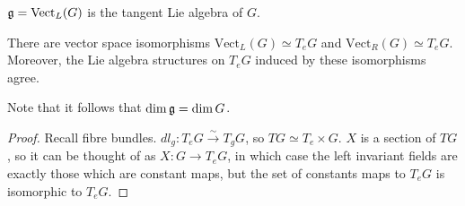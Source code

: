  \begin{definition}
   $\mathfrak{g} = \mathrm{Vect}_L(G)$ is the tangent Lie algebra of $G$. 
 \end{definition}

 \begin{proposition}
   There are vector space isomorphisms $\mathrm{Vect}_L(G)\simeq T_eG$ and
   $\mathrm{Vect}_R(G)\simeq T_eG$. Moreover, the Lie algebra structures on $T_eG$
   induced by these isomorphisms agree.
 \end{proposition}
 Note that it follows that $\dim \mathfrak{g}=\dim G$.
 \begin{proof}
   Recall fibre bundles. $dl_g:T_eG\xrightarrow{\sim} T_gG$, so $TG\simeq T_e\times
   G$. $X$ is a section of $TG$, so it can be thought of as
   $X:G\to T_eG$, in which case the left invariant fields are exactly those which are
   constant maps, but the set of constants maps to $T_eG$ is isomorphic to $T_eG$.
 \end{proof}

